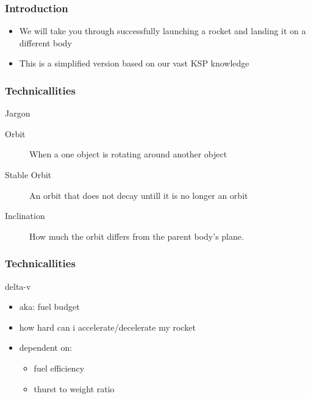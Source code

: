 \begin{frame}
    \frametitle{Introduction}
    \begin{block}{}
        \begin{itemize}
            \item We will take you through successfully launching a rocket and landing it on a different body
            \item This is a simplified version based on our vast KSP knowledge
        \end{itemize}
    \end{block}
\end{frame}
\begin{frame}
    \frametitle{Technicallities}
    \begin{block}{Jargon}
        \begin{description}
            \item [Orbit] When a one object is rotating around another object
            \item [Stable Orbit] An orbit that does not decay untill it is no longer an orbit
            \item [Inclination] How much the orbit differs from the parent body's plane.
        \end{description}
    \end{block}
\end{frame}
\begin{frame}
    \frametitle{Technicallities}
    \begin{block}{delta-v}
        \begin{itemize}
            \item aka: fuel budget
            \item how hard can i accelerate/decelerate my rocket
            \item dependent on:
            \begin{itemize}
                \item fuel efficiency
                \item thurst to weight ratio
            \end{itemize}
        \end{itemize}
    \end{block}
\end{frame}
